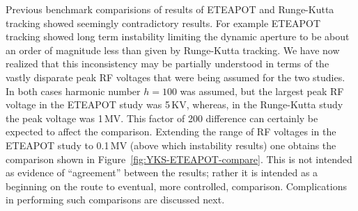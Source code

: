 \documentclass[12]{article}
\begin{document}
Previous benchmark comparisions of results
of ETEAPOT and Runge-Kutta tracking showed 
seemingly contradictory results. For example ETEAPOT tracking\cite{Benchmark-III} 
showed long term instability limiting the dynamic aperture
to be about an order of magnitude less than given by Runge-Kutta 
tracking\cite{YKS-tracking}. We have now
realized that this inconsistency may be partially understood in terms of
the vastly disparate peak RF voltages that were being assumed for the
two studies. In both cases harmonic number $h=100$ was assumed, but 
the largest peak RF voltage in the ETEAPOT study was 5\,KV, whereas, 
in the Runge-Kutta study the peak voltage was 1\,MV. 
This factor of 200 difference can certainly be expected to affect the
comparison. Extending the range of RF voltages in the ETEAPOT study 
to 0.1\,MV (above which instability results) one obtains the comparison 
shown in Figure~\ref{fig:YKS-ETEAPOT-compare}. This is not intended
as evidence of ``agreement'' between the results; rather it is intended 
as a beginning on the route to eventual, more controlled, comparison. 
Complications in performing such comparisons are discussed next.
\end{document}
